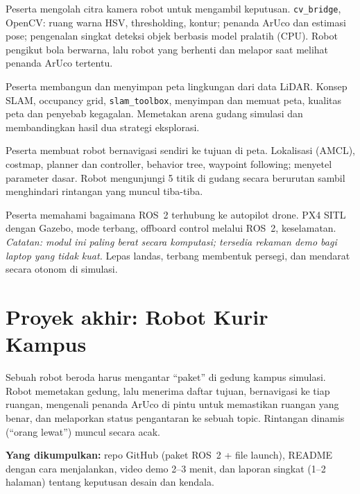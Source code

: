 \documentclass{rtl}
\begin{document}
{Peserta mengolah citra kamera robot untuk mengambil keputusan.}
{\texttt{cv\_bridge}, OpenCV: ruang warna HSV, thresholding, kontur; penanda ArUco dan estimasi pose; pengenalan singkat deteksi objek berbasis model pralatih (CPU).}
{Robot pengikut bola berwarna, lalu robot yang berhenti dan melapor saat melihat penanda ArUco tertentu.}

{Peserta membangun dan menyimpan peta lingkungan dari data LiDAR.}
{Konsep SLAM, occupancy grid, \texttt{slam\_toolbox}, menyimpan dan memuat peta, kualitas peta dan penyebab kegagalan.}
{Memetakan arena gudang simulasi dan membandingkan hasil dua strategi eksplorasi.}

{Peserta membuat robot bernavigasi sendiri ke tujuan di peta.}
{Lokalisasi (AMCL), costmap, planner dan controller, behavior tree, waypoint following; menyetel parameter dasar.}
{Robot mengunjungi 5 titik di gudang secara berurutan sambil menghindari rintangan yang muncul tiba-tiba.}

{Peserta memahami bagaimana ROS~2 terhubung ke autopilot drone.}
{PX4 SITL dengan Gazebo, mode terbang, offboard control melalui ROS~2, keselamatan.\newline
\emph{Catatan: modul ini paling berat secara komputasi; tersedia rekaman demo bagi laptop yang tidak kuat.}}
{Lepas landas, terbang membentuk persegi, dan mendarat secara otonom di simulasi.}

\section*{Proyek akhir: Robot Kurir Kampus}
\begin{sorotan}[title={Brief proyek}]
Sebuah robot beroda harus mengantar ``paket'' di gedung kampus simulasi.
Robot memetakan gedung, lalu menerima daftar tujuan, bernavigasi ke tiap ruangan,
mengenali penanda ArUco di pintu untuk memastikan ruangan yang benar, dan
melaporkan status pengantaran ke sebuah topic. Rintangan dinamis (``orang lewat'')
muncul secara acak.
\end{sorotan}

\textbf{Yang dikumpulkan:} repo GitHub (paket ROS~2 + file launch), README dengan
cara menjalankan, video demo 2--3 menit, dan laporan singkat (1--2 halaman)
tentang keputusan desain dan kendala.
\end{document}
